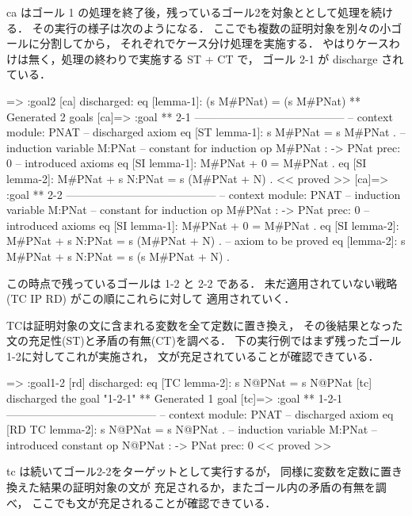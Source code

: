 \documentclass[a4paper,oneside,10pt,here]{memoir}
\newenvironment{vvtm}%
{\parskip=0pt\lineskip=0pt\begin{center}\begin{minipage}{0.8\textwidth}\begin{snugshade}}%
  {\end{snugshade}\end{minipage}\end{center}}
\begin{document}
ca はゴール 1 の処理を終了後，残っているゴール2を対象ととして処理を続ける．
その実行の様子は次のようになる．
ここでも複数の証明対象を別々の小ゴールに分割してから，
それぞれでケース分け処理を実施する．
やはりケースわけは無く，処理の終わりで実施する ST + CT で，
ゴール 2-1 が discharge されている．

\begin{vvtm}
\begin{simplev}
[ca]=> :goal{2}
[ca] discharged: eq [lemma-1]: (s M#PNat) = (s M#PNat)
** Generated 2 goals
[ca]=>
:goal { ** 2-1 -----------------------------------------
  -- context module: PNAT
  -- discharged axiom
    eq [ST lemma-1]: s M#PNat = s M#PNat .
  -- induction variable
    M:PNat
  -- constant for induction
    op M#PNat : -> PNat { prec: 0 }
  -- introduced axioms
    eq [SI lemma-1]: M#PNat + 0 = M#PNat .
    eq [SI lemma-2]: M#PNat + s N:PNat = s (M#PNat + N) .
} << proved >>
[ca]=>
:goal { ** 2-2 -----------------------------------------
  -- context module: PNAT
  -- induction variable
    M:PNat
  -- constant for induction
    op M#PNat : -> PNat { prec: 0 }
  -- introduced axioms
    eq [SI lemma-1]: M#PNat + 0 = M#PNat .
    eq [SI lemma-2]: M#PNat + s N:PNat = s (M#PNat + N) .
  -- axiom to be proved
    eq [lemma-2]: s M#PNat + s N:PNat = s (s M#PNat + N) .
}
\end{simplev}
\end{vvtm}

この時点で残っているゴールは 1-2 と 2-2 である．
未だ適用されていない戦略 (TC IP RD) がこの順にこれらに対して
適用されていく．

TCは証明対象の文に含まれる変数を全て定数に置き換え，
その後結果となった文の充足性(ST)と矛盾の有無(CT)を調べる．
下の実行例ではまず残ったゴール1-2に対してこれが実施され，
文が充足されていることが確認できている．

\begin{vvtm}
\begin{simplev}
[tc]=> :goal{1-2}
[rd] discharged: 
  eq [TC lemma-2]: s N@PNat = s N@PNat
[tc] discharged the goal "1-2-1"
** Generated 1 goal
[tc]=>
:goal { ** 1-2-1 -----------------------------------------
  -- context module: PNAT
  -- discharged axiom
    eq [RD TC lemma-2]: s N@PNat = s N@PNat .
  -- induction variable
    M:PNat
  -- introduced constant
    op N@PNat : -> PNat { prec: 0 }
} << proved >>
\end{simplev}
\end{vvtm}

tc は続いてゴール2-2をターゲットとして実行するが，
同様に変数を定数に置き換えた結果の証明対象の文が
充足されるか，またゴール内の矛盾の有無を調べ，
ここでも文が充足されることが確認できている．
\end{document}
